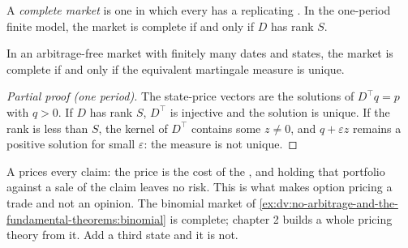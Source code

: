 \begin{definition}\label{def:dv:no-arbitrage-and-the-fundamental-theorems:complete}
A \emph{complete market} is one in which every
 has a replicating . In the one-period
finite model, the market is complete if and only if $D$ has rank $S$.
\end{definition}

\begin{theorem}\label{thm:dv:no-arbitrage-and-the-fundamental-theorems:ftap2}
In an arbitrage-free market with finitely many dates and states, the market is
complete if and only if the equivalent martingale measure is unique.
\end{theorem}
\begin{proof}[Partial proof (one period)]
The state-price vectors are the solutions of $D^\top q=p$ with $q>0$. If $D$
has rank $S$, $D^\top$ is injective and the solution is unique. If the rank is
less than $S$, the kernel of $D^\top$ contains some $z\ne0$, and $q+\varepsilon z$
remains a positive solution for small $\varepsilon$: the measure is not unique.
\end{proof}

A  prices every claim: the price is the cost of the , and holding that portfolio against a sale of the claim leaves no
risk. This is what makes option pricing a trade and not an opinion. The
binomial market of \cref{ex:dv:no-arbitrage-and-the-fundamental-theorems:binomial}
is complete; chapter 2 builds a whole pricing theory from it. Add a third state
and it is not.

